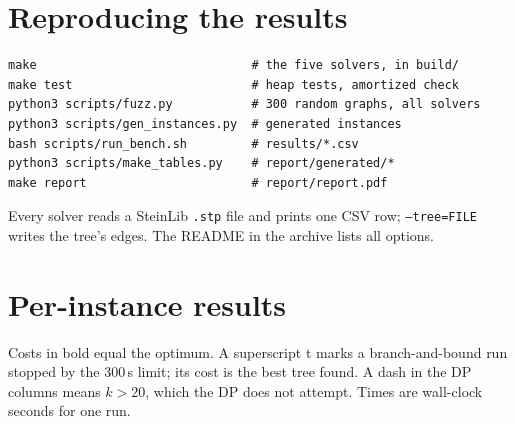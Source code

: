 \section{Reproducing the results}\label{app:repro}
\begin{verbatim}
make                              # the five solvers, in build/
make test                         # heap tests, amortized check
python3 scripts/fuzz.py           # 300 random graphs, all solvers
python3 scripts/gen_instances.py  # generated instances
bash scripts/run_bench.sh         # results/*.csv
python3 scripts/make_tables.py    # report/generated/*
make report                       # report/report.pdf
\end{verbatim}
Every solver reads a SteinLib \texttt{.stp} file and prints one CSV row; \texttt{--tree=FILE} writes the tree's edges.
The README in the archive lists all options.

\section{Per-instance results}\label{app:tables}
Costs in bold equal the optimum. A superscript t marks a branch-and-bound run stopped by the 300\,s limit; its cost is the best tree
found. A dash in the DP columns means \(k>20\), which the DP does not attempt. Times are wall-clock seconds for one run.


